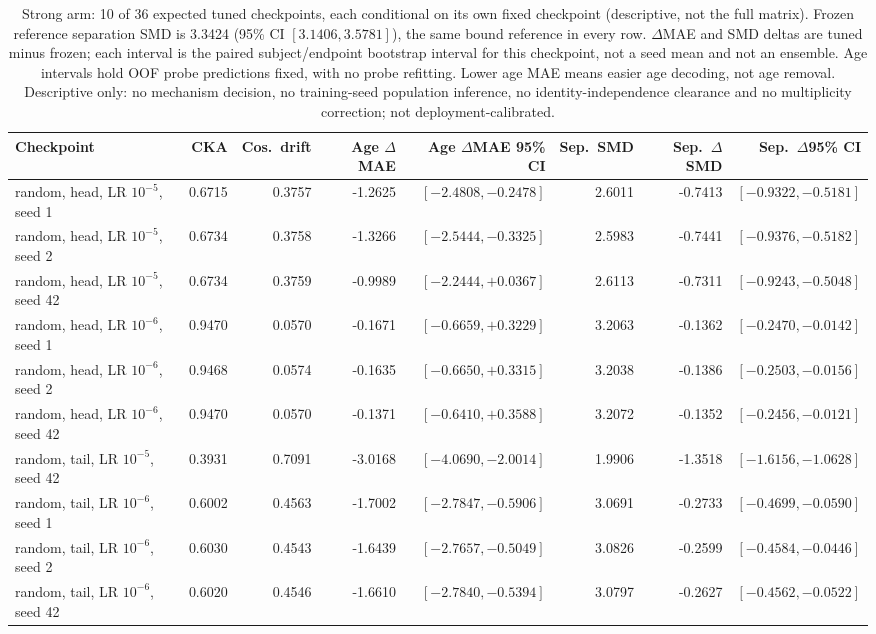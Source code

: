 \begin{table}[!t]
\caption{Strong arm: 10 of 36 expected tuned checkpoints, each conditional on its own fixed checkpoint (descriptive, not the full matrix). Frozen reference separation SMD is 3.3424 (95\% CI $[3.1406,3.5781]$), the same bound reference in every row. $\Delta$MAE and SMD deltas are tuned minus frozen; each interval is the paired subject/endpoint bootstrap interval for this checkpoint, not a seed mean and not an ensemble. Age intervals hold OOF probe predictions fixed, with no probe refitting. Lower age MAE means easier age decoding, not age removal. Descriptive only: no mechanism decision, no training-seed population inference, no identity-independence clearance and no multiplicity correction; not deployment-calibrated.}
\label{tab:common-mechanism-strong}
\centering\scriptsize
\begin{tabular}{@{}lrrrrrrr@{}}
\toprule
Checkpoint & CKA & Cos.\ drift & Age $\Delta$MAE & Age $\Delta$MAE 95\% CI & Sep.\ SMD & Sep.\ $\Delta$SMD & Sep.\ $\Delta$95\% CI \\
\midrule
random, head, LR $10^{-5}$, seed 1 & 0.6715 & 0.3757 & -1.2625 & $[-2.4808,-0.2478]$ & 2.6011 & -0.7413 & $[-0.9322,-0.5181]$ \\
random, head, LR $10^{-5}$, seed 2 & 0.6734 & 0.3758 & -1.3266 & $[-2.5444,-0.3325]$ & 2.5983 & -0.7441 & $[-0.9376,-0.5182]$ \\
random, head, LR $10^{-5}$, seed 42 & 0.6734 & 0.3759 & -0.9989 & $[-2.2444,+0.0367]$ & 2.6113 & -0.7311 & $[-0.9243,-0.5048]$ \\
random, head, LR $10^{-6}$, seed 1 & 0.9470 & 0.0570 & -0.1671 & $[-0.6659,+0.3229]$ & 3.2063 & -0.1362 & $[-0.2470,-0.0142]$ \\
random, head, LR $10^{-6}$, seed 2 & 0.9468 & 0.0574 & -0.1635 & $[-0.6650,+0.3315]$ & 3.2038 & -0.1386 & $[-0.2503,-0.0156]$ \\
random, head, LR $10^{-6}$, seed 42 & 0.9470 & 0.0570 & -0.1371 & $[-0.6410,+0.3588]$ & 3.2072 & -0.1352 & $[-0.2456,-0.0121]$ \\
random, tail, LR $10^{-5}$, seed 42 & 0.3931 & 0.7091 & -3.0168 & $[-4.0690,-2.0014]$ & 1.9906 & -1.3518 & $[-1.6156,-1.0628]$ \\
random, tail, LR $10^{-6}$, seed 1 & 0.6002 & 0.4563 & -1.7002 & $[-2.7847,-0.5906]$ & 3.0691 & -0.2733 & $[-0.4699,-0.0590]$ \\
random, tail, LR $10^{-6}$, seed 2 & 0.6030 & 0.4543 & -1.6439 & $[-2.7657,-0.5049]$ & 3.0826 & -0.2599 & $[-0.4584,-0.0446]$ \\
random, tail, LR $10^{-6}$, seed 42 & 0.6020 & 0.4546 & -1.6610 & $[-2.7840,-0.5394]$ & 3.0797 & -0.2627 & $[-0.4562,-0.0522]$ \\
\bottomrule
\end{tabular}
\end{table}
